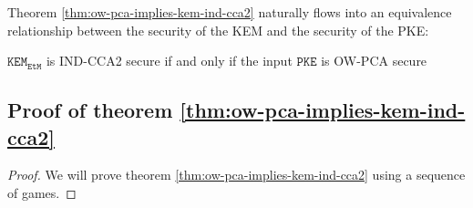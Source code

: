 \documentclass[floatrow,journal=tches,submission]{iacrtrans}
\newcommand{\pke}{\texttt{PKE}}
\newcommand{\kem}{\texttt{KEM}}
\newcommand{\etm}{\texttt{EtM}}  %
\begin{document}
Theorem \ref{thm:ow-pca-implies-kem-ind-cca2} naturally flows into an equivalence relationship between the security of the KEM and the security of the PKE:

\begin{lemma}
    $\kem_\etm$ is IND-CCA2 secure if and only if the input $\pke$ is OW-PCA secure
\end{lemma}

\subsection{Proof of theorem \ref{thm:ow-pca-implies-kem-ind-cca2}}
\begin{proof}
    We will prove theorem \ref{thm:ow-pca-implies-kem-ind-cca2} using a sequence of games.


\end{proof}
\end{document}
